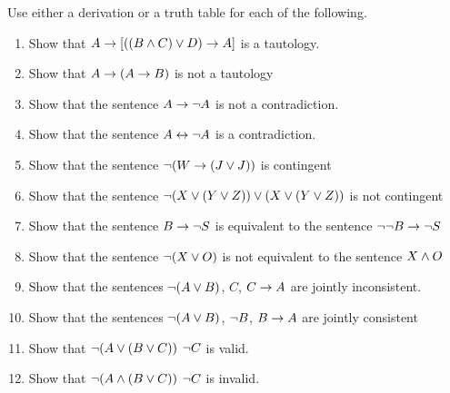 \practiceproblems
\noindent\problempart Use either a derivation or a truth table for each of the following. 
\begin{enumerate}%
\item Show that $A \rightarrow [((B \wedge C) \vee D) \rightarrow A]$ is a tautology.
\item Show that $A \rightarrow (A \rightarrow B)$ is not a tautology
\item Show that the sentence $A \rightarrow \neg{A}$ is not a contradiction.
\item Show that the sentence $A \leftrightarrow \neg A$ is a contradiction. 
\item Show that the sentence $ \neg (W \rightarrow (J \vee J)) $ is contingent
\item Show that the sentence $ \neg(X \vee (Y \vee Z)) \vee (X \vee (Y \vee Z))$ is not contingent
 \item Show that the sentence $B \rightarrow \neg S$ is equivalent to the sentence $\neg \neg B \rightarrow \neg S$
\item Show that the sentence $ \neg (X \vee O) $ is not equivalent to the sentence $X \wedge O$
\item Show that the sentences $\neg(A \vee B)$, $C$, $C \rightarrow A$  are jointly inconsistent.
\item Show that the sentences $\neg(A \vee B)$, $\neg{B}$, $B \rightarrow A$ are jointly consistent
\item Show that $\neg(A \vee (B \vee C)) $ \therefore $ \neg{C}$ is valid.
\item Show that $\neg(A \wedge (B \vee C))$ \therefore $ \neg{C}$ is invalid. 
\end{enumerate}


